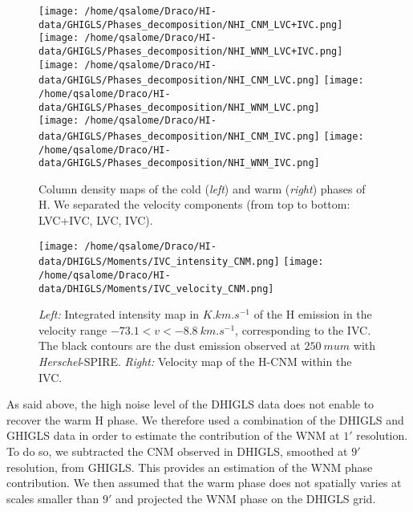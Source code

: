 \documentclass[traditabstract]{aa}
\begin{document}
\begin{figure*}[h]
  \centering
  \texttt{[image: /home/qsalome/Draco/HI-data/GHIGLS/Phases\_decomposition/NHI\_CNM\_LVC+IVC.png]}
  \hspace{5mm}
  \texttt{[image: /home/qsalome/Draco/HI-data/GHIGLS/Phases\_decomposition/NHI\_WNM\_LVC+IVC.png]} \\
  \vspace{5mm}
  \texttt{[image: /home/qsalome/Draco/HI-data/GHIGLS/Phases\_decomposition/NHI\_CNM\_LVC.png]}
  \hspace{5mm}
  \texttt{[image: /home/qsalome/Draco/HI-data/GHIGLS/Phases\_decomposition/NHI\_WNM\_LVC.png]} \\
  \vspace{5mm}
  \texttt{[image: /home/qsalome/Draco/HI-data/GHIGLS/Phases\_decomposition/NHI\_CNM\_IVC.png]}
  \hspace{5mm}
  \texttt{[image: /home/qsalome/Draco/HI-data/GHIGLS/Phases\_decomposition/NHI\_WNM\_IVC.png]}
  \caption{\label{Phases_HI} Column density maps of the cold (\emph{left}) and warm (\emph{right}) phases of H. We separated the velocity components (from top to bottom: LVC+IVC, LVC, IVC).}
\end{figure*}



\begin{figure*}[h]
  \centering
  \texttt{[image: /home/qsalome/Draco/HI-data/DHIGLS/Moments/IVC\_intensity\_CNM.png]}
  \hspace{3mm}
  \texttt{[image: /home/qsalome/Draco/HI-data/DHIGLS/Moments/IVC\_velocity\_CNM.png]}
  \caption{\label{Draco_HI} \emph{Left:} Integrated intensity map in $K.km.s^{-1}$ of the H emission in the velocity range $-73.1<v<-8.8\: km.s^{-1}$, corresponding to the IVC. The black contours are the dust emission observed at $250\: mu m$ with \emph{Herschel}-SPIRE. \emph{Right:} Velocity map of the H-CNM within the IVC.}
\end{figure*}

   As said above, the high noise level of the DHIGLS data does not enable to recover the warm H phase. We therefore used a combination of the DHIGLS and GHIGLS data in order to estimate the contribution of the WNM at $1'$ resolution. To do so, we subtracted the CNM observed in DHIGLS, smoothed at $9'$ resolution, from GHIGLS. This provides an estimation of the WNM phase contribution. We then assumed that the warm phase does not spatially varies at scales smaller than $9'$ and projected the WNM phase on the DHIGLS grid.
\end{document}
